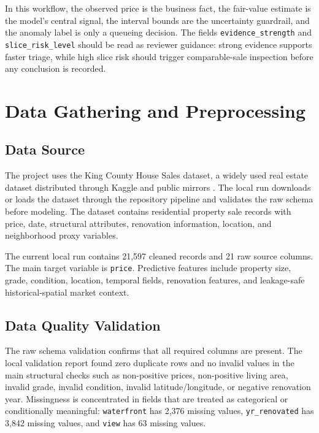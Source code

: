 \documentclass[12pt,a4paper]{article}
\begin{document}
In this workflow, the observed price is the business fact, the fair-value estimate is the model's central signal, the interval bounds are the uncertainty guardrail, and the anomaly label is only a queueing decision. The fields \texttt{evidence\_strength} and \texttt{slice\_risk\_level} should be read as reviewer guidance: strong evidence supports faster triage, while high slice risk should trigger comparable-sale inspection before any conclusion is recorded.

\section{Data Gathering and Preprocessing}

\subsection{Data Source}
The project uses the King County House Sales dataset, a widely used real estate dataset distributed through Kaggle and public mirrors \citep{kagglekingcounty}. The local run downloads or loads the dataset through the repository pipeline and validates the raw schema before modeling. The dataset contains residential property sale records with price, date, structural attributes, renovation information, location, and neighborhood proxy variables.

The current local run contains 21,597 cleaned records and 21 raw source columns. The main target variable is \texttt{price}. Predictive features include property size, grade, condition, location, temporal fields, renovation features, and leakage-safe historical-spatial market context.

\subsection{Data Quality Validation}
The raw schema validation confirms that all required columns are present. The local validation report found zero duplicate rows and no invalid values in the main structural checks such as non-positive prices, non-positive living area, invalid grade, invalid condition, invalid latitude/longitude, or negative renovation year. Missingness is concentrated in fields that are treated as categorical or conditionally meaningful: \texttt{waterfront} has 2,376 missing values, \texttt{yr\_renovated} has 3,842 missing values, and \texttt{view} has 63 missing values.
\end{document}
